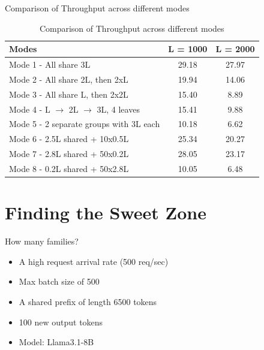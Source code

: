 \documentclass[Serif, 10pt, brown]{beamer}
\theoremstyle{example}
\theoremstyle{plain}
\begin{document}
\begin{frame}{Comparison of Throughput across different modes}
\begin{table}[h!]
\centering
\begin{tabular}{|l|c|c|}
\hline
\textbf{Modes} & \textbf{L = 1000} & \textbf{L = 2000} \\
\hline
Mode 1 - All share 3L & 29.18 & 27.97 \\
Mode 2 - All share 2L, then 2xL & 19.94 & 14.06 \\
Mode 3 - All share L, then 2x2L& 15.40 & 8.89 \\
Mode 4 - L $\rightarrow$ 2L $\rightarrow$ 3L, 4 leaves& 15.41 & 9.88 \\
Mode 5 - 2 separate groups with 3L each & 10.18 & 6.62 \\
Mode 6 - 2.5L shared + 10x0.5L & 25.34 & 20.27 \\
Mode 7 - 2.8L shared + 50x0.2L & 28.05 & 23.17 \\
Mode 8 - 0.2L shared + 50x2.8L & 10.05 & 6.48 \\
\hline
\end{tabular}
\caption{Comparison of Throughput across different modes}
\end{table}
\end{frame}


\section{Finding the Sweet Zone}
\begin{frame}{How many families?}
\begin{itemize}
    \item A high request arrival rate (500 req/sec)
    \item Max batch size of 500
    \item A shared prefix of length 6500 tokens
    \item 100 new output tokens 
    \item Model: Llama3.1-8B
\end{itemize}
\begin{table}
\centering
{}
\end{table}
\end{frame}
\end{document}

